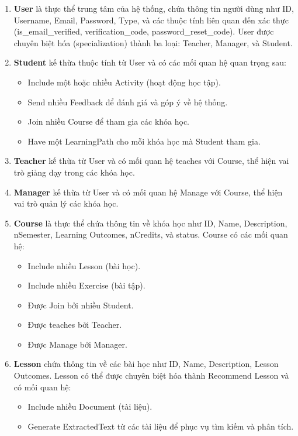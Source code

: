 \begin{enumerate}
\item \textbf{User} là thực thể trung tâm của hệ thống, chứa thông tin người dùng như ID, Username, Email, Password, Type, và các thuộc tính liên quan đến xác thực (is\_email\_verified, verification\_code, password\_reset\_code). User được chuyên biệt hóa (specialization) thành ba loại: Teacher, Manager, và Student.

\item \textbf{Student} kế thừa thuộc tính từ User và có các mối quan hệ quan trọng sau:
\begin{itemize}
    \item Include một hoặc nhiều Activity (hoạt động học tập).
    \item Send nhiều Feedback để đánh giá và góp ý về hệ thống.
    \item Join nhiều Course để tham gia các khóa học.
    \item Have một LearningPath cho mỗi khóa học mà Student tham gia.
\end{itemize}

\item \textbf{Teacher} kế thừa từ User và có mối quan hệ teaches với Course, thể hiện vai trò giảng dạy trong các khóa học.

\item \textbf{Manager} kế thừa từ User và có mối quan hệ Manage với Course, thể hiện vai trò quản lý các khóa học.

\item \textbf{Course} là thực thể chứa thông tin về khóa học như ID, Name, Description, nSemester, Learning Outcomes, nCredits, và status. Course có các mối quan hệ:
\begin{itemize}
    \item Include nhiều Lesson (bài học).
    \item Include nhiều Exercise (bài tập).
    \item Được Join bởi nhiều Student.
    \item Được teaches bởi Teacher.
    \item Được Manage bởi Manager.
\end{itemize}

\item \textbf{Lesson} chứa thông tin về các bài học như ID, Name, Description, Lesson Outcomes. Lesson có thể được chuyên biệt hóa thành Recommend Lesson và có mối quan hệ:
\begin{itemize}
    \item Include nhiều Document (tài liệu).
    \item Generate ExtractedText từ các tài liệu để phục vụ tìm kiếm và phân tích.
\end{itemize}


\end{enumerate}
